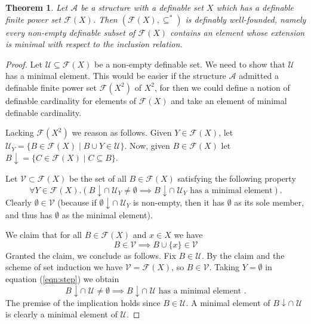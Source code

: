 \documentclass{amsart}
\newcommand{\ca}{\mathcal}
\theoremstyle{plain}
\newtheorem{thm}{Theorem}[section]
\theoremstyle{definition}
\newcommand{\F}{\mathcal{F}}
\begin{document}
\begin{thm} \label{thm:well-founded} Let $\ca A$ be a structure with a definable set $X$ which has a definable finite power set $\F (X)$. Then $(\F(X), \subseteq^*)$ is definably well-founded, namely every non-empty definable subset of $\F(X)$ contains an element whose extension is minimal with respect to the inclusion relation.
\end{thm}

\begin{proof}
Let $\ca U \subseteq \F (X)$ be a non-empty definable set. 
 We need to show that $\ca U$ has a minimal element. This would be easier if the structure $\ca A$ admitted a definable finite power set $\F (X^2)$ of $X^2$, for then we could define a notion of definable cardinality for elements of $\F(X)$ and take an element of minimal definable cardinality. 

Lacking $\F(X^2)$ we reason as follows. 
Given $Y\in \F(X)$, let $\ca U_Y = \{ B\in \F (X) \mid B \cup Y \in \ca U\}$. Now, given $B\in \F(X)$ let $B\! \downarrow = \{C \in \F(X) \mid C \subseteq B\}$. 

Let $\ca V \subset \F (X)$ be the set of all $B\in \F(X)$ satisfying the following property
%
\begin{equation}\label{eqn:step}
\forall Y\in \F(X). (B \! \downarrow  \cap  \; \ca U_Y\neq \emptyset \implies B \! \downarrow  \cap  \; \ca U_Y \text{ has a minimal element}).
\end{equation}
%
Clearly $\emptyset \in \ca V$ (because if $\emptyset \!\downarrow \cap \; \ca U_Y$ is non-empty, then it has $\emptyset$ as its sole member, and thus has $\emptyset$ as the minimal element). 

We claim that for all $B\in \F(X)$ and $x\in X$ we have
%
$$B\in \ca V \implies B\cup \{x\} \in \ca V$$ 
%
Granted the claim, we conclude as follows. Fix $B \in \ca U$. By the claim and the scheme of set induction we have $\ca V = \F(X)$, so $B\in \ca V$. Taking $Y = \emptyset$ in equation (\ref{eqn:step}) we obtain
%
$$B\!\downarrow \cap \; \ca U \neq \emptyset \implies B\!\downarrow \cap \; \ca U  \text{ has a minimal element }.$$
The premise of the implication holds since $B\in \ca U$. A minimal element of $B \downarrow \cap \;  \mathcal{U}$ is clearly a minimal element of $\ca U$. 


\end{proof}
\end{document}
